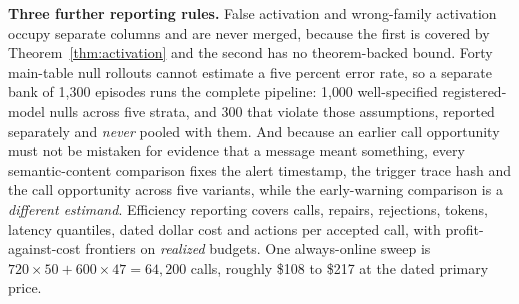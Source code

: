 \textbf{Three further reporting rules.} False activation and wrong-family
activation occupy separate columns and are never merged, because the first is
covered by Theorem~\ref{thm:activation} and the second has no theorem-backed
bound. Forty main-table null rollouts cannot estimate a five percent error rate,
so a separate bank of 1{,}300 episodes runs the complete pipeline: 1{,}000
well-specified registered-model nulls across five strata, and 300 that violate
those assumptions, reported separately and \emph{never} pooled with them. And
because an earlier call opportunity must not be mistaken for evidence that a
message meant something, every semantic-content comparison fixes the alert
timestamp, the trigger trace hash and the call opportunity across five variants,
while the early-warning comparison is a \emph{different estimand}. Efficiency
reporting covers calls, repairs, rejections, tokens, latency quantiles, dated
dollar cost and actions per accepted call, with profit-against-cost frontiers on
\emph{realized} budgets. One always-online sweep is
$720 \times 50 + 600 \times 47 = 64{,}200$ calls, roughly \$108 to \$217 at the
dated primary price.
